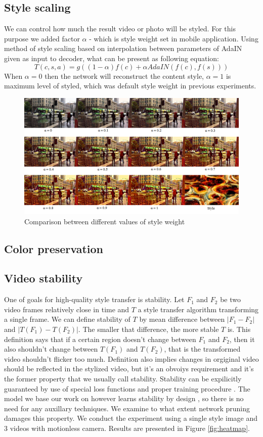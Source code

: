 \documentclass[../Main.tex]{subfiles}
\begin{document}
\subsection{Style scaling}
We can control how much the result video or photo will be styled. For this purpose we added factor $\alpha$ -  which is style weight set in mobile application. Using method of style scaling based on interpolation between parameters of AdaIN given as input to decoder, what can be present as following equation: $$T(c,s,a) = g((1-\alpha)f(c)+\alpha AdaIN(f(c),f(s)))$$ When $\alpha= 0$  then the network will reconstruct the content style, $\alpha = 1$ is maximum level of styled, which was default style weight in previous experiments. 

\begin{figure}[h!]
    \centering
    \includegraphics[scale=0.75]{Images/style1.png}
    \caption{Comparison between different values of style weight}
    \label{fig:style1}
\end{figure}

\subsection{Color preservation}
\subsection{Video stability}
One of goals for high-quality style transfer is stability. Let $F_1$ and $F_2$ be 
two video frames relatively close in time and $T$ a style transfer algorithm transforming
a single frame. We can define stability of $T$ by mean difference between
$| F_1 - F_2 |$ and $|T(F_1)-T(F_2)|$. The smaller that difference, the more stable $T$ is.
This definition says that if a certain region doesn't change between $F_1$ and $F_2$, then
it also shouldn't change between $T(F_1)$ and $T(F_2)$, that is the transformed video
shouldn't flicker too much. Definition also implies changes in orgiginal video
should be reflected in the stylized video, but it's an obvoiys requirement and it's
the former property that we usually call stability.
Stability can be expilicitly guaranteed by use of special loss functions
and proper training procedure \cite{stability1, stability2}. The model we base our work
on however learns stability by design \cite{Li2018}, so there is no need for
any auxillary techniques. We examine to what extent network pruning damages this 
property. We conduct the experiment using a single style image and 3 videos with motionless
camera. Results are presented in Figure \ref{fig:heatmap}.
\end{document}
